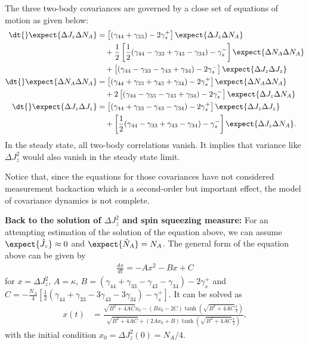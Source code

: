 \documentclass[]{report}
\begin{document}
The three two-body covariances are governed by a close set of equations of motion as given below:
\begin{align}
\dt{} \expect{\Delta J_z \Delta N_A} &= \left[(\gamma_{44}+\gamma_{33})-2\gamma_s^+ \right] \expect{\Delta J_z \Delta N_A} \nonumber \\
&\quad +  \frac{1}{2} \left[\frac{1}{2}(\gamma_{44}-\gamma_{33}+\gamma_{43}-\gamma_{34})-\gamma_s^- \right]\expect{\Delta N_A \Delta N_A}\nonumber\\
&\quad + \left[(\gamma_{44}-\gamma_{33} - \gamma_{43}+\gamma_{34})-2\gamma_s^- \right]\expect{\Delta J_z \Delta J_z}\\
\dt{} \expect{\Delta N_A \Delta N_A} &= \left[(\gamma_{44}+\gamma_{33}+\gamma_{43}+\gamma_{34})-2\gamma_s^+ \right]\expect{\Delta N_A \Delta N_A}\nonumber\\
&\quad +2 \left[(\gamma_{44}-\gamma_{33}-\gamma_{43}+\gamma_{34})-2\gamma_s^- \right]\expect{\Delta J_z \Delta N_A}\\
\dt{}\expect{\Delta J_z \Delta J_z} &= \left[(\gamma_{44}+\gamma_{33}-\gamma_{43}-\gamma_{34})-2\gamma_s^+ \right]\expect{\Delta J_z \Delta J_z}\nonumber\\
&\quad +\left[\frac{1}{2}(\gamma_{44}-\gamma_{33}+\gamma_{43}-\gamma_{34})-\gamma_s^- \right]\expect{\Delta J_z \Delta N_A}.
\end{align}
In the steady state, all two-body correlations vanish.
It implies that variance like $ \Delta J_z^2 $ would also vanish in the steady state limit. 

Notice that, since the equations for those covariances have not considered measurement backaction which is a second-order but important effect, the model of covariance dynamics is not complete.


\textbf{Back to the solution of $ \Delta J_z^2 $ and spin squeezing measure:}
For an attempting estimation of the solution of the equation above, we can assume $ \expect{\hat{J}_z}\approx 0 $ and $ \expect{\hat{N}_A}=N_A $. 
The general form of the equation above can be given by
\begin{align}
	\frac{d x}{d t} = -A x^2 - B x + C
\end{align}
for $ x=\Delta J_z^2 $, $ A = \kappa $, $ B=(\gamma_{44}+\gamma_{33}-\gamma_{43}-\gamma_{34} ) -2\gamma_s^+ $ and $ C=-\frac{N_A}{4}\left[\frac{1}{2}(\gamma_{44}+\gamma_{33}-3\gamma_{43}-3\gamma_{34} ) -\gamma_s^+\right]  $. 
It can be solved as~\cite{Baragiola2014a}
\begin{align}
x(t)&  = \frac{ \sqrt{B^2 + 4 AC}x_0 - (Bx_0-2C) \tanh \left( \sqrt{B^2 + 4 AC}  \frac{t}{2} \right) }{\sqrt{B^2 + 4 AC} + (2Ax_0 + B) \tanh \left( \sqrt{B^2 + 4 AC}  \frac{t}{2} \right) } ,
\end{align}
with the initial condition $x_0=\Delta J_z^2(0)=N_A/4$. 
\end{document}
